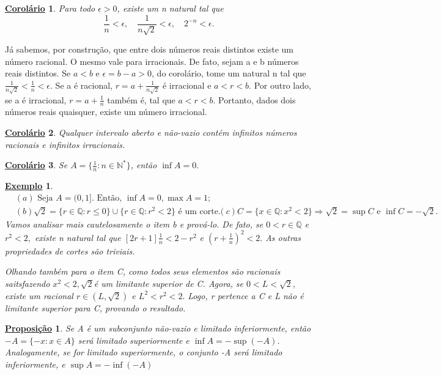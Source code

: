 \documentclass{article}
\newtheorem*{prop*}{\underline{Proposi\c c\~ao}}
\newtheorem{example}{\underline{Exemplo}}
\newtheorem*{crl*}{\underline{Corol\'ario}}
\begin{document}
\begin{crl*}
  Para todo $\epsilon > 0$, existe um n natural tal que 
  $$
  \frac{1}{n} < \epsilon, \quad \frac{1}{n\sqrt{2}}<\epsilon, \quad 2^{-n} < \epsilon.
  $$
\end{crl*}
  J\'a sabemos, por constru\c c\~ao, que entre dois n\'umeros reais distintos existe um n\'umero racional. O mesmo vale para irracionais.
De fato, sejam a e b n\'umeros reais distintos. Se $a < b$ e $\epsilon = b - a > 0$, do corol\'ario, tome um natural n tal que
$\displaystyle \frac{1}{n\sqrt{2}} < \frac{1}{n} < \epsilon.$ Se a \'e racional, $r = \displaystyle a + \frac{1}{n\sqrt{2}}$ \'e irracional e
 $a < r < b.$ Por outro lado, se a \'e irracional, $r =\displaystyle a + \frac{1}{n}$ tamb\'em \'e, tal que $a < r < b.$ Portanto,
 dados dois n\'umeros reais quaisquer, existe um n\'umero irracional.
\begin{crl*}
  Qualquer intervalo aberto e n\~ao-vazio cont\'em infinitos n\'umeros racionais e infinitos irracionais.
\end{crl*}
\begin{crl*}
  Se $A = \biggr\{\displaystyle \frac{1}{n}: n\in \mathbb{N}^*\biggl\}$, ent\~ao $\inf A = 0.$
\end{crl*}
\begin{example}
 \begin{align*}
   &(a) \text{ Seja }A = (0, 1]. \text{ Ent\~ao, } \inf{A} = 0, \max{A} = 1; \\
   &(b) \sqrt{2} = \{r\in\mathbb{Q}: r \leq 0\}\cup \{r\in\mathbb{Q}: r^2 < 2\}\text{ \'e um corte.} 
   &(c) C = \{x\in\mathbb{Q}: x^2 < 2\} \Rightarrow \sqrt{2}=\sup{C}\text{ e }\inf{C} = -\sqrt{2}.
 \end{align*}
 Vamos analisar mais cautelosamente o item b e prov\'a-lo. De fato, se $0 < r\in \mathbb{Q}$ e $r^2 < 2,$ existe n natural tal que 
 $[2r + 1]\frac{1}{n} < 2 - r^2$ e $(r + \frac{1}{n})^2 < 2.$ As outras propriedades de cortes s\~ao triviais. 

 Olhando tamb\'em para o item C, como todos seus elementos s\~ao racionais saitsfazendo $x^2 < 2, \sqrt{2}$\'e um limitante superior de C.
 Agora, se $0 < L < \sqrt{2}$, existe um racional $r\in(L, \sqrt{2})$ e $L^2 < r^2 < 2.$ Logo, r pertence a C e L n\~ao \'e limitante superior para C,
 provando o resultado.
\end{example}
\begin{prop*}
  Se A \'e um subconjunto n\~ao-vazio e limitado inferiormente, ent\~ao $-A = \{-x: x\in A\}$ ser\'a limitado superiormente e 
  $\inf{A} = -\sup{(-A)}$. Analogamente, se for limitado superiormente, o conjunto -A ser\'a limitado inferiormente, e $\sup{A}=-\inf{(-A)}$
\end{prop*}
\end{document}
